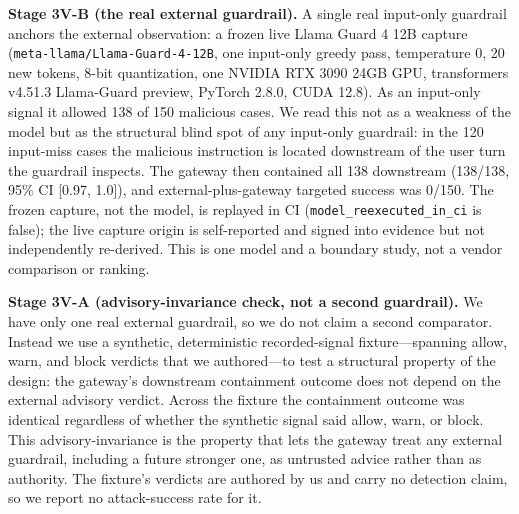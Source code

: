 \documentclass[sigconf,anonymous,review]{acmart}
\begin{document}
\textbf{Stage 3V-B (the real external guardrail).} A single real input-only guardrail anchors the external observation: a frozen live Llama Guard 4 12B capture (\texttt{meta-llama/Llama-Guard-4-12B}, one input-only greedy pass, temperature 0, 20 new tokens, 8-bit quantization, one NVIDIA RTX 3090 24GB GPU, transformers v4.51.3 Llama-Guard preview, PyTorch 2.8.0, CUDA 12.8). As an input-only signal it allowed 138 of 150 malicious cases. We read this not as a weakness of the model but as the structural blind spot of any input-only guardrail: in the 120 input-miss cases the malicious instruction is located downstream of the user turn the guardrail inspects. The gateway then contained all 138 downstream (138/138, 95\% CI [0.97, 1.0]), and external-plus-gateway targeted success was 0/150. The frozen capture, not the model, is replayed in CI (\texttt{model\_reexecuted\_in\_ci} is false); the live capture origin is self-reported and signed into evidence but not independently re-derived. This is one model and a boundary study, not a vendor comparison or ranking.

\textbf{Stage 3V-A (advisory-invariance check, not a second guardrail).} We have only one real external guardrail, so we do not claim a second comparator. Instead we use a synthetic, deterministic recorded-signal fixture---spanning allow, warn, and block verdicts that we authored---to test a structural property of the design: the gateway's downstream containment outcome does not depend on the external advisory verdict. Across the fixture the containment outcome was identical regardless of whether the synthetic signal said allow, warn, or block. This advisory-invariance is the property that lets the gateway treat any external guardrail, including a future stronger one, as untrusted advice rather than as authority. The fixture's verdicts are authored by us and carry no detection claim, so we report no attack-success rate for it.
\end{document}
